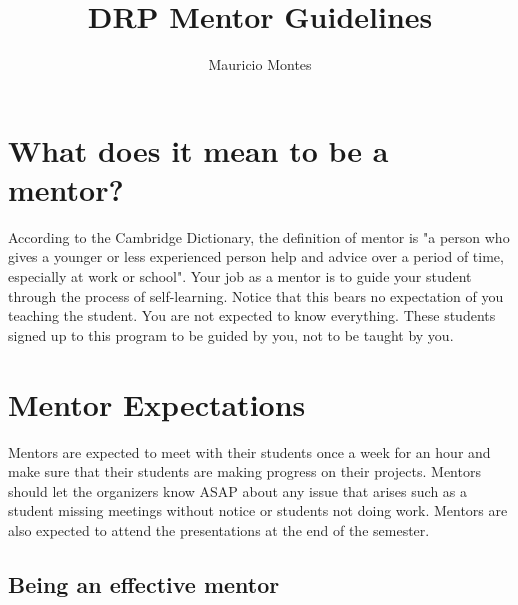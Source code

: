 \documentclass{article}
\begin{document}
\author{Mauricio Montes}
\title{DRP Mentor Guidelines}

\maketitle

\section{What does it mean to be a mentor?}

According to the Cambridge Dictionary, the definition of mentor is "a person who gives a younger or
less experienced person help and advice over a period of time, especially at work or school". Your
job as a mentor is to guide your student through the process of self-learning. Notice that this
bears no expectation of you teaching the student. You are not expected to know everything. These
students signed up to this program to be guided by you, not to be taught by you. 


\section{Mentor Expectations}

Mentors are expected to meet with their students once a week for an hour and make sure that their
students are making progress on their projects. Mentors should let the organizers know ASAP about
any issue that arises such as a student missing meetings without notice or students not doing work.
Mentors are also expected to attend the presentations at the end of the semester. 

\subsection{Being an effective mentor}
\end{document}
